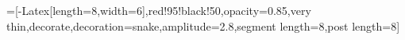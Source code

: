 



\usepackage{tikzsymbols}
\usetikzlibrary{shapes.symbols}

\usetikzlibrary{calc}
\usetikzlibrary{arrows,arrows.meta,math}
\usetikzlibrary{decorations.markings}
\usetikzlibrary{angles,quotes} %
\usetikzlibrary{fadings}

\usetikzlibrary{3d}

\usepackage{tikz-3dplot}

=[-{Latex[length=8,width=6]},red!95!black!50,opacity=0.85,very thin,decorate,decoration={snake,amplitude=2.8,segment length=8,post length=8}]

\contourlength{1.4pt}

